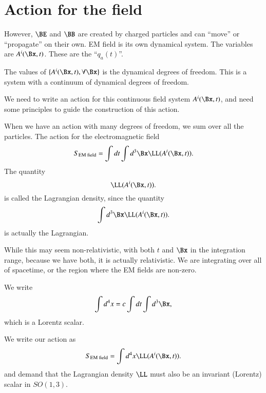 %
%
\section{Action for the field}

However, \(\BE\) and \(\BB\) are created by charged particles and can ``move'' or ``propagate'' on their own.  EM field is its own dynamical system.  The variables are \(A^i(\Bx, t)\).  These are the ``\(q_a(t)\)''.

The values of \(\{A^i(\Bx, t), \forall \Bx\}\) is the dynamical degrees of freedom.  This is a system with a continuum of dynamical degrees of freedom.

We need to write an action for this continuous field system \(A^i(\Bx,t)\), and need some principles to guide the construction of this action.

When we have an action with many degrees of freedom, we sum over all the particles.  The action for the electromagnetic field
%
\begin{equation}\label{eqn:relativisticElectrodynamicsL12b:90}
S_{\text{EM field}} = \int dt \int d^3\Bx \LL(A^i(\Bx, t)).
\end{equation}
%
The quantity
%
\begin{equation}\label{eqn:relativisticElectrodynamicsL12b:110}
\LL(A^i(\Bx, t)).
\end{equation}
%
is called the Lagrangian density, since the quantity
%
\begin{equation}\label{eqn:relativisticElectrodynamicsL12b:130}
\int d^3\Bx \LL(A^i(\Bx, t)).
\end{equation}
%
is actually the Lagrangian.

While this may seem non-relativistic, with both \(t\) and \(\Bx\) in the integration range, because we have both, it is actually relativistic.  We are integrating over all of spacetime, or the region where the EM fields are non-zero.

We write
%
\begin{equation}\label{eqn:relativisticElectrodynamicsL12b:150}
\int d^4 x  = c \int dt \int d^3 \Bx,
\end{equation}
%
which is a Lorentz scalar.

We write our action as
%
\begin{equation}\label{eqn:relativisticElectrodynamicsL12b:170}
S_{\text{EM field}} = \int d^4 x \LL(A^i(\Bx, t)).
\end{equation}
%
and demand that the Lagrangian density \(\LL\) must also be an invariant (Lorentz) scalar in \(SO(1,3)\).
%
